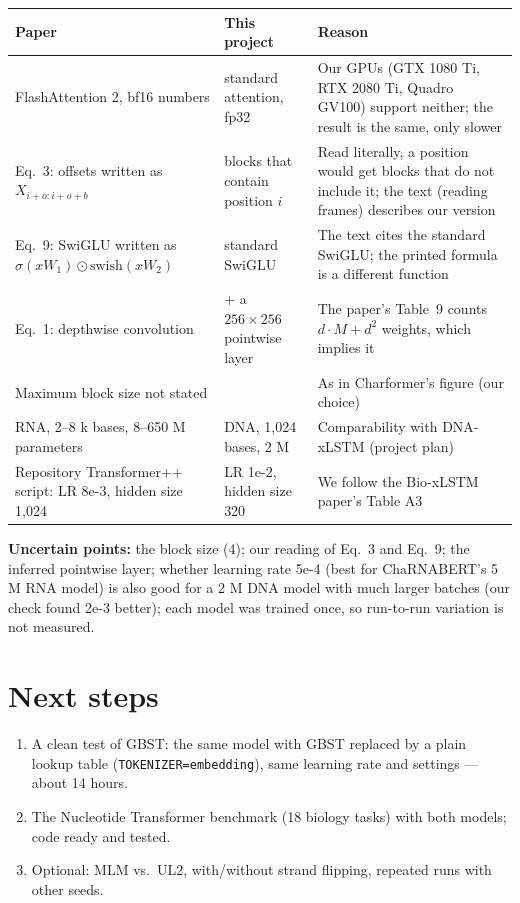 \documentclass[11pt,a4paper]{article}
\newcommand{\code}[1]{\texttt{\small #1}}
\begin{document}
\begin{center}\small
\begin{tabularx}{\linewidth}{>{\raggedright\arraybackslash}p{4.3cm}>{\raggedright\arraybackslash}p{3.4cm}L}
\toprule
Paper & This project & Reason \\
\midrule
FlashAttention 2, bf16 numbers & standard attention, fp32 & Our GPUs (GTX 1080 Ti, RTX 2080 Ti, Quadro GV100) support neither; the result is the same, only slower \\
Eq.~3: offsets written as $X_{i+o:i+o+b}$ & blocks that contain position $i$ & Read literally, a position would get blocks that do not include it; the text (reading frames) describes our version \\
Eq.~9: SwiGLU written as $\sigma(xW_1)\odot\text{swish}(xW_2)$ & standard SwiGLU & The text cites the standard SwiGLU; the printed formula is a different function \\
Eq.~1: depthwise convolution & + a $256\times256$ pointwise layer & The paper's Table~9 counts $d\cdot M + d^2$ weights, which implies it \\
Maximum block size not stated & 4 & As in Charformer's figure (our choice) \\
RNA, 2--8 k bases, 8--650 M parameters & DNA, 1,024 bases, 2 M & Comparability with DNA-xLSTM (project plan) \\
Repository Transformer++ script: LR 8e-3, hidden size 1,024 & LR 1e-2, hidden size 320 & We follow the Bio-xLSTM paper's Table A3 \\
\bottomrule
\end{tabularx}
\end{center}

\textbf{Uncertain points:} the block size (4); our reading of Eq.~3 and Eq.~9; the inferred
pointwise layer; whether learning rate 5e-4 (best for ChaRNABERT's 5 M RNA model) is also good for
a 2 M DNA model with much larger batches (our check found 2e-3 better); each model was trained
once, so run-to-run variation is not measured.

\section{Next steps}
\begin{enumerate}
\item A clean test of GBST: the same model with GBST replaced by a plain lookup table
  (\code{TOKENIZER=embedding}), same learning rate and settings --- about 14 hours.
\item The Nucleotide Transformer benchmark (18 biology tasks) with both models; code ready and tested.
\item Optional: MLM vs.\ UL2, with/without strand flipping, repeated runs with other seeds.
\end{enumerate}
\end{document}
